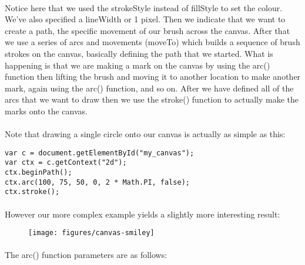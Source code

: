 \paragraph{} Notice here that we used the strokeStyle instead of fillStyle to set the colour. We've also specified a lineWidth or 1 pixel. Then we indicate that we want to create a path, the specific movement of our brush across the canvas. After that we use a series of arcs and movements (moveTo) which builds a sequence of brush strokes on the canvas, basically defining the path that we started. What is happening is that we are making a mark on the canvas by using the arc() function then lifting the brush and moving it to another location to make another mark, again using the arc() function, and so on. After we have defined all of the arcs that we want to draw then we use the stroke() function to actually make the marks onto the canvas.
\paragraph{} Note that drawing a single circle onto our canvas is actually as simple as this:

\begin{lstlisting}
var c = document.getElementById("my_canvas");
var ctx = c.getContext("2d");
ctx.beginPath();
ctx.arc(100, 75, 50, 0, 2 * Math.PI, false);
ctx.stroke();
\end{lstlisting}

\paragraph{} However our more complex example yields a slightly more interesting result:

\begin{figure}[H]
\centering
\texttt{[image: figures/canvas-smiley]}
\label{fig:canvas-smiley}
\caption{}
\end{figure}


\paragraph{} The arc() function parameters are as follows:

